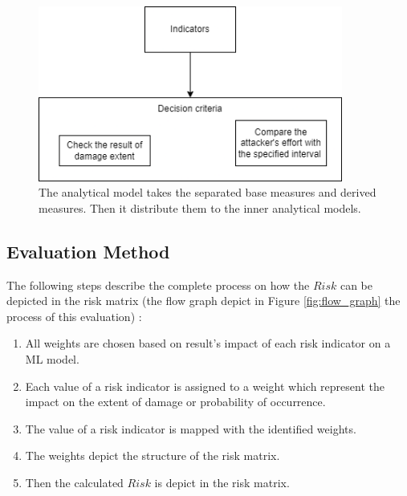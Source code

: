 \begin{figure}[ht!]
  \centering
  \includegraphics[width=10cm]{pictures/impl_dec_criteria.png}
  \caption{The analytical model takes the separated base measures and derived measures. Then it distribute them to the inner analytical models.}
  \label{fig:impl_dec_criteria}
\end{figure}

\subsection{Evaluation Method}

The following steps describe the complete process on how the $Risk$ can be depicted in the risk matrix (the flow graph depict in Figure \ref{fig:flow_graph} the process of this evaluation) \cite{DBLP:journals/corr/abs-2012-04884}:

\begin{enumerate}
  \item All weights are chosen based on result's impact of each risk indicator on a ML model.
  \item Each value of a risk indicator is assigned to a weight which represent the impact on the extent of damage or probability of occurrence.
  \item The value of a risk indicator is mapped with the identified weights.
  \item The weights depict the structure of the risk matrix.
  \item Then the calculated $Risk$ is depict in the risk matrix.
\end{enumerate}

